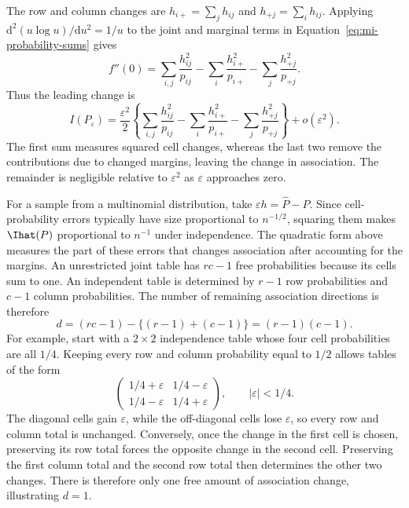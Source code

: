 The row and column changes are \(h_{i+}=\sum_jh_{ij}\) and
\(h_{+j}=\sum_ih_{ij}\). Applying
\(\mathrm d^2(u\log u)/\mathrm du^2=1/u\) to the joint and marginal
terms in Equation~\eqref{eq:mi-probability-sums} gives
\begin{equation}
 f''(0)=\sum_{i,j}\frac{h_{ij}^2}{p_{ij}}
        -\sum_i\frac{h_{i+}^2}{p_{i+}}
        -\sum_j\frac{h_{+j}^2}{p_{+j}}.
\end{equation}
Thus the leading change is
\begin{equation}
 I(P_\varepsilon)
 =\frac{\varepsilon^2}{2}
  \left\{\sum_{i,j}\frac{h_{ij}^2}{p_{ij}}
        -\sum_i\frac{h_{i+}^2}{p_{i+}}
        -\sum_j\frac{h_{+j}^2}{p_{+j}}\right\}
  +o(\varepsilon^2).
 \label{eq:appendix-mi-second-order}
\end{equation}
The first sum measures squared cell changes, whereas the last two remove the
contributions due to changed margins, leaving the change in association.
The remainder is negligible relative to \(\varepsilon^2\) as
\(\varepsilon\) approaches zero.

For a sample from a multinomial distribution, take \(\varepsilon h=\widehat P-P\).
Since cell-probability errors typically have size proportional to \(n^{-1/2}\),
squaring them makes \(\Ihat(P)\) proportional to \(n^{-1}\) under
independence. The quadratic form above measures the part of these errors
that changes association after accounting for the margins. An unrestricted
joint table has \(rc-1\) free probabilities because its cells sum to one.
An independent table is determined by \(r-1\) row probabilities and
\(c-1\) column probabilities. The number of remaining association
directions is therefore
\begin{equation}
 d=(rc-1)-\{(r-1)+(c-1)\}=(r-1)(c-1).
 \label{eq:independence-association-dimension}
\end{equation}
For example, start with a \(2\times2\) independence table whose four cell
probabilities are all \(1/4\). Keeping every row and column probability
equal to \(1/2\) allows tables of the form
\begin{equation*}
 \begin{pmatrix}
  1/4+\varepsilon&1/4-\varepsilon\\
  1/4-\varepsilon&1/4+\varepsilon
 \end{pmatrix},
 \qquad |\varepsilon|<1/4.
\end{equation*}
The diagonal cells gain \(\varepsilon\), while the off-diagonal cells
lose \(\varepsilon\), so every row and column total is unchanged.
Conversely, once the change in the first cell is chosen, preserving its
row total forces the opposite change in the second cell. Preserving the
first column total and the second row total then determines the other
two changes. There is therefore only one free amount of association
change, illustrating \(d=1\).


